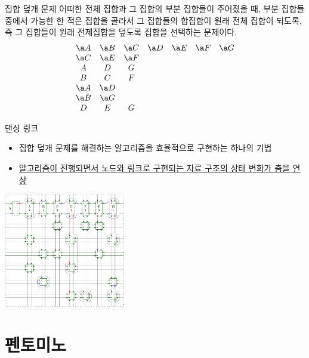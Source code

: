 \documentclass[xcolor=svgnames]{beamer}
\begin{document}
\renewcommand\arraystretch{1.1}
%
\begin{frame}{집합 덮개 문제}
  어떠한 전체 집합과 그 집합의 부분 집합들이 주어졌을 때, 부분 집합들 중에서 가능한 한
  적은 집합을 골라서 그 집합들의 합집합이 원래 전체 집합이 되도록, 즉 그 집합들이
  원래 전제집합을 \alert{덮도록} 집합을 선택하는 문제이다.
  {\large\boldmath
  $$
  \begin{array}{ccccccc}
    \a A & \a B & \a C & \a D & \a E & \a F & \a G\\
    \a C & \a E & \a F &&&&\\
    A & D & G &&&&\\
    B & C & F &&&&\\
    \a A & \a D &&&&&\\
    \a B & \a G &&&&&\\
    D & E & G &&&&
  \end{array}
  $$}
\end{frame}

%
\begin{frame}{댄싱 링크}
  \begin{itemize}
  \item 집합 덮개 문제를 해결하는 알고리즘을 효율적으로 구현하는 하나의 기법
  \item \href{https://www.youtube.com/watch?v=pN76VICZiKU&start=100}
    {알고리즘이 진행되면서 노드와 링크로 구현되는 자료 구조의 상태 변화가 춤을 연상}
  \end{itemize}
    
  \centering\includegraphics[height=50mm]{imgs/cdance-4.png}
\end{frame}


\section{펜토미노}
\end{document}
